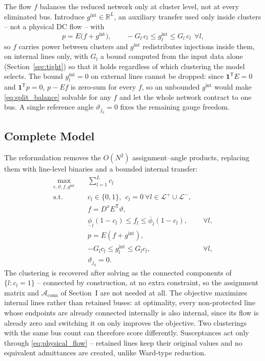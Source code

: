 \documentclass[journal]{IEEEtran}
\newcommand{\R}{\mathbb{R}}
\newcommand{\gint}{g^{\mathrm{int}}}
\begin{document}
The flow $f$ balances the reduced network only at cluster level, not at every eliminated bus. Introduce $\gint\in\R^L$, an auxiliary transfer used only inside clusters -- not a physical DC flow -- with
\begin{equation}
 p=E\bigl(f+\gint\bigr),
 \qquad
 -G_l\,c_l\le \gint_l\le G_l\,c_l\ \ \forall l,
 \label{eq:split_balance}
\end{equation}
so $f$ carries power between clusters and $\gint$ redistributes injections inside them, on internal lines only, with $G_l$ a bound computed from the input data alone (Section~\ref{sec:tight}) so that it holds regardless of which clustering the model selects. The bound $\gint_l=0$ on external lines cannot be dropped: since $\mathbf 1^{\mathsf T}E=0$ and $\mathbf 1^{\mathsf T}p=0$, $p-Ef$ is zero-sum for every $f$, so an unbounded $\gint$ would make \eqref{eq:split_balance} solvable for any $f$ and let the whole network contract to one bus. A single reference angle $\vartheta_{j_0}=0$ fixes the remaining gauge freedom.

\subsection{Complete Model}

The reformulation removes the $O(N^2)$ assignment--angle products, replacing them with line-level binaries and a bounded internal transfer:
\begin{subequations}
\label{eq:edge_model}
\begin{align}
\max_{c,\vartheta,f,\gint}\quad
&\sum_{l=1}^{L} c_l
\\
\mathrm{s.t.}\quad
&c_l\in\{0,1\},\ \ c_l=0\ \forall l\in\mathcal L^+\cup\mathcal L^-,
\\
&f=D^xE^{\mathsf T}\vartheta,
\\
&\underline{\phi}_l(1-c_l)\le f_l\le\overline{\phi}_l(1-c_l),
&&\forall l,
\\
&p=E(f+\gint),
\\
&-G_l c_l\le \gint_l\le G_l c_l,
&&\forall l,
\\
&\vartheta_{j_0}=0.
\end{align}
\end{subequations}
The clustering is recovered after solving as the connected components of $\{l:c_l=1\}$ -- connected by construction, at no extra constraint, so the assignment matrix and $\mathcal A_{\mathrm{conn}}$ of Section~I are not needed at all. The objective maximizes internal lines rather than retained buses: at optimality, every non-protected line whose endpoints are already connected internally is also internal, since its flow is already zero and switching it on only improves the objective. Two clusterings with the same bus count can therefore score differently. Susceptances act only through \eqref{eq:physical_flow} -- retained lines keep their original values and no equivalent admittances are created, unlike Ward-type reduction.
\end{document}
